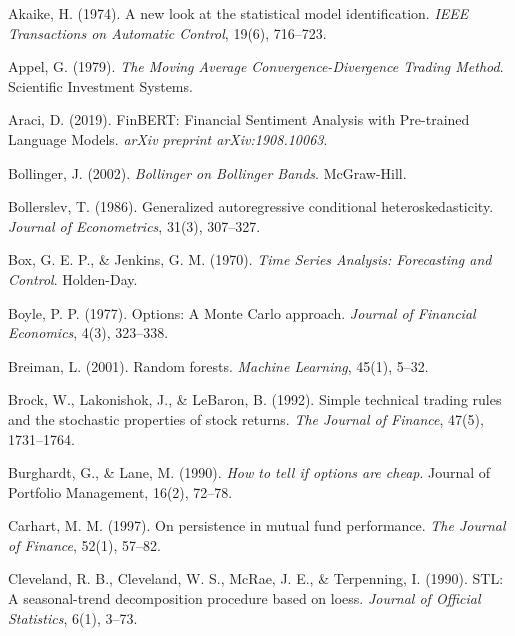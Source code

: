 \documentclass[12pt, a4paper, oneside]{report}
\begin{document}
\begin{enumerate}[label={[\arabic*]}, nosep, leftmargin=*, itemsep=4pt]

\item Akaike, H. (1974). A new look at the statistical model identification. \textit{IEEE Transactions on Automatic Control}, 19(6), 716--723.

\item Appel, G. (1979). \textit{The Moving Average Convergence-Divergence Trading Method}. Scientific Investment Systems.

\item Araci, D. (2019). FinBERT: Financial Sentiment Analysis with Pre-trained Language Models. \textit{arXiv preprint arXiv:1908.10063}.

\item Bollinger, J. (2002). \textit{Bollinger on Bollinger Bands}. McGraw-Hill.

\item Bollerslev, T. (1986). Generalized autoregressive conditional heteroskedasticity. \textit{Journal of Econometrics}, 31(3), 307--327.

\item Box, G. E. P., \& Jenkins, G. M. (1970). \textit{Time Series Analysis: Forecasting and Control}. Holden-Day.

\item Boyle, P. P. (1977). Options: A Monte Carlo approach. \textit{Journal of Financial Economics}, 4(3), 323--338.

\item Breiman, L. (2001). Random forests. \textit{Machine Learning}, 45(1), 5--32.

\item Brock, W., Lakonishok, J., \& LeBaron, B. (1992). Simple technical trading rules and the stochastic properties of stock returns. \textit{The Journal of Finance}, 47(5), 1731--1764.

\item Burghardt, G., \& Lane, M. (1990). \textit{How to tell if options are cheap}. Journal of Portfolio Management, 16(2), 72--78.

\item Carhart, M. M. (1997). On persistence in mutual fund performance. \textit{The Journal of Finance}, 52(1), 57--82.

\item Cleveland, R. B., Cleveland, W. S., McRae, J. E., \& Terpenning, I. (1990). STL: A seasonal-trend decomposition procedure based on loess. \textit{Journal of Official Statistics}, 6(1), 3--73.


\end{enumerate}
\end{document}
